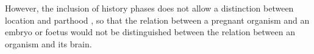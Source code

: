 %
%
%
%

%
%



%

However, the inclusion of history phases does not allow a distinction between location and parthood \cite{Jansen:Schulz}, so that the relation between a pregnant organism and an embryo or foetus would not be distinguished between the relation between an organism and its brain.


